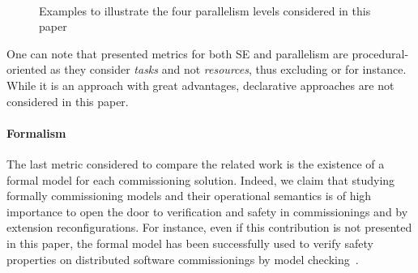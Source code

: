 \begin{figure*}[t!]
  \begin{center}
    \\

    \caption{Examples to illustrate the four parallelism levels
      considered in this paper}
    \label{fig:parlevels}
  \end{center}
\end{figure*}

One can note that presented metrics for both SE and parallelism are
procedural-oriented as they consider \emph{tasks} and not
\emph{resources}, thus excluding \puppet or \salt for instance. While
it is an approach with great advantages, declarative approaches are
not considered in this paper.

\paragraph{Formalism}
The last metric considered to compare the related work is the
existence of a formal model for each commissioning solution. Indeed,
we claim that studying formally commissioning models and their
operational semantics is of high importance to open the door to
verification and safety in commissionings and by extension
reconfigurations. For instance, even if this contribution is not
presented in this paper, the formal model \mad has been
successfully used to verify safety properties on distributed software
commissionings by model checking~\cite{coullon:hal-02323641}.

